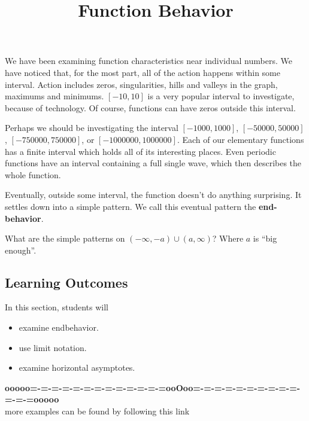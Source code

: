 \documentclass{ximera}
\title{Function Behavior}
\begin{document}
\begin{abstract}
\end{abstract}
\maketitle




We have been examining function characteristics near individual numbers. We have noticed that, for the most part, all of the action happens within some interval.  Action includes zeros, singularities, hills and valleys in the graph, maximums and minimums.  $[-10, 10]$  is a very popular interval to investigate, because of technology.  Of course, functions can have zeros outside this interval.  

Perhaps we should be investigating the interval $[-1000, 1000]$, $[-50000, 50000]$, $[-750000, 750000]$, or $[-1000000, 1000000]$. Each of our elementary functions has a finite interval which holds all of its interesting places.  Even periodic functions have an interval containing a full single wave, which then describes the whole function.

Eventually, outside some interval, the function doesn't do anything surprising.  It settles down into a simple pattern.  We call this eventual pattern the \textbf{\textcolor{purple!85!blue}{end-behavior}}.



What are the simple patterns on $(-\infty, -a) \cup (a, \infty)$?  Where $a$ is ``big enough''.








\subsection{Learning Outcomes}


\begin{sectionOutcomes}
In this section, students will 

\begin{itemize}
\item examine endbehavior.
\item use limit notation.
\item examine horizontal asymptotes.
\end{itemize}
\end{sectionOutcomes}










\begin{center}
\textbf{\textcolor{green!50!black}{ooooo=-=-=-=-=-=-=-=-=-=-=-=-=ooOoo=-=-=-=-=-=-=-=-=-=-=-=-=ooooo}} \\

more examples can be found by following this link\\ 

\end{center}
\end{document}
